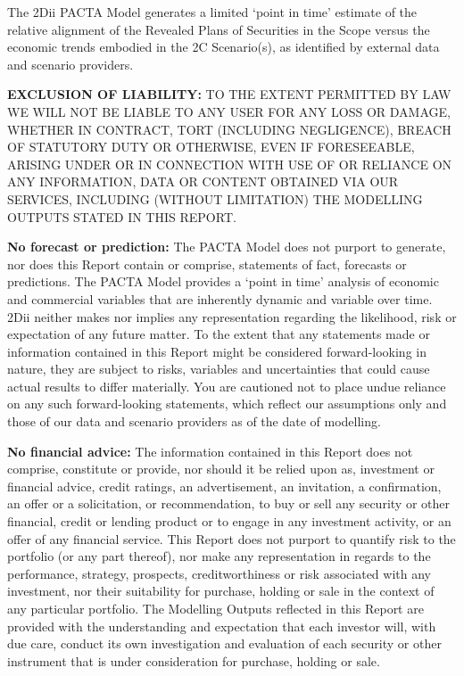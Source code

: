 \documentclass[10pt,table,a4]{article}\usepackage[]{graphicx}\usepackage[]{color}
\begin{document}
	
	The 2Dii PACTA Model generates a limited `point in time' estimate of the relative alignment of the Revealed Plans of Securities in the Scope versus the economic trends embodied in the 2C Scenario(s), as identified by external data and scenario providers. 
	
	\textbf{EXCLUSION OF LIABILITY: }TO THE EXTENT PERMITTED BY LAW WE WILL NOT BE LIABLE TO ANY USER FOR ANY LOSS OR DAMAGE, WHETHER IN CONTRACT, TORT (INCLUDING NEGLIGENCE), BREACH OF STATUTORY DUTY OR OTHERWISE, EVEN IF FORESEEABLE, ARISING UNDER OR IN CONNECTION WITH USE OF OR RELIANCE ON ANY INFORMATION, DATA OR CONTENT OBTAINED VIA OUR SERVICES, INCLUDING (WITHOUT LIMITATION) THE MODELLING OUTPUTS STATED IN THIS REPORT.
	
	\textbf{No forecast or prediction: }The PACTA Model does not purport to generate, nor does this Report contain or comprise, statements of fact, forecasts or predictions. The PACTA Model provides a `point in time' analysis of economic and commercial variables that are inherently dynamic and variable over time. 2Dii neither makes nor implies any representation regarding the likelihood, risk or expectation of any future matter. To the extent that any statements made or information contained in this Report might be considered forward-looking in nature, they are subject to risks, variables and uncertainties that could cause actual results to differ materially. You are cautioned not to place undue reliance on any such forward-looking statements, which reflect our assumptions only and those of our data and scenario providers as of the date of modelling.
	
	\textbf{No financial advice: }The information contained in this Report does not comprise, constitute or provide, nor should it be relied upon as, investment or financial advice, credit ratings, an advertisement, an invitation, a confirmation, an offer or a solicitation, or recommendation, to buy or sell any security or other financial, credit or lending product or to engage in any investment activity, or an offer of any financial service. This Report does not purport to quantify risk to the portfolio (or any part thereof), nor make any representation in regards to the performance, strategy, prospects, creditworthiness or risk associated with any investment, nor their suitability for purchase, holding or sale in the context of any particular portfolio. The Modelling Outputs reflected in this Report are provided with the understanding and expectation that each investor will, with due care, conduct its own investigation and evaluation of each security or other instrument that is under consideration for purchase, holding or sale. 
	
\end{document}
